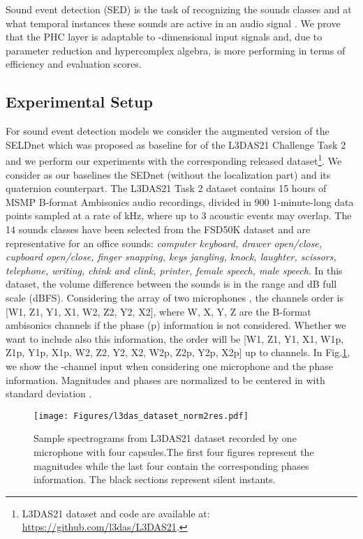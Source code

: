 \documentclass[lettersize,journal]{IEEEtran}
\begin{document}
Sound event detection (SED) is the task of recognizing the sounds classes and at what temporal instances these sounds are active in an audio signal \cite{SED2021Mesaros}. We prove that the PHC layer is adaptable to -dimensional input signals and, due to parameter reduction and hypercomplex algebra, is more performing in terms of efficiency and evaluation scores.

\subsection{Experimental Setup}

For sound event detection models we consider the augmented version of the SELDnet \cite{Adavanne2019SoundEL, ComminielloICASSP2019a} which was proposed as baseline for of the L3DAS21 Challenge Task 2 \cite{guizzo2021l3das21} and we perform our experiments with the corresponding released dataset\footnote{L3DAS21 dataset and code are available at: \url{https://github.com/l3das/L3DAS21}.}. We consider as our baselines the SEDnet (without the localization part) and its quaternion counterpart. The L3DAS21 Task 2 dataset contains 15 hours of MSMP B-format Ambisonics audio recordings, divided in 900 1-minute-long data points sampled at a rate of  kHz, where up to 3 acoustic events may overlap. The 14 sounds classes have been selected from the FSD50K dataset and are representative for an office sounds: \textit{computer keyboard, drawer open/close, cupboard open/close, finger snapping, keys jangling, knock, laughter, scissors, telephone, writing, chink and clink, printer, female speech, male speech}. In this dataset, the volume difference between the sounds is in the range  and  dB full scale (dBFS). Considering the array of two microphones , the channels order is [W1, Z1, Y1, X1, W2, Z2, Y2, X2], where W, X, Y, Z are the B-format ambisonics
channels if the phase (p) information is not considered. Whether we want to include also this information, the order will be [W1, Z1, Y1, X1, W1p, Z1p, Y1p, X1p, W2, Z2, Y2, X2, W2p, Z2p, Y2p, X2p] up to  channels. In Fig.\ref{fig:l3das_dataset}, we show the -channel input when considering one microphone and the phase information. Magnitudes and phases are normalized to be centered in  with standard deviation .

\begin{figure}[t]
    \centering
    \texttt{[image: Figures/l3das\_dataset\_norm2res.pdf]}
    \caption{Sample spectrograms from L3DAS21 dataset recorded by one microphone with four capsules.The first four figures represent the magnitudes while the last four contain the corresponding phases information. The black sections represent silent instants.}
    \label{fig:l3das_dataset}
\end{figure}
\end{document}
